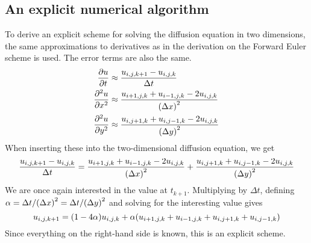 \subsection{An explicit numerical algorithm}
To derive an explicit scheme for solving the diffusion equation in two dimensions, the same approximations to derivatives as in the derivation on the Forward Euler scheme is used. The error terms are also the same.
\begin{alignat*}{2}
    \pdv{u}{t} &\approx \frac{u_{i,j,k+1} - u_{i,j,k}}{\Delta t}\\
    \pdv[2]{u}{x} &\approx \frac{u_{i+1,j,k} + u_{i-1,j,k} - 2u_{i,j,k}}{\qty(\Delta x)^2}\\
    \pdv[2]{u}{y} &\approx \frac{u_{i,j+1,k} + u_{i,j-1,k} - 2u_{i,j,k}}{\qty(\Delta y)^2}
\end{alignat*}
When inserting these into the two-dimensional diffusion equation, we get
\[
    \frac{u_{i,j,k+1} - u_{i,j,k}}{\Delta t} =
    \frac{u_{i+1,j,k} + u_{i-1,j,k} - 2u_{i,j,k}}{\qty(\Delta x)^2} +
    \frac{u_{i,j+1,k} + u_{i,j-1,k} - 2u_{i,j,k}}{\qty(\Delta y)^2}
\]
We are once again interested in the value at \(t_{k+1}\). Multiplying by \(\Delta t\), defining \(\alpha=\Delta t/\qty(\Delta x)^2=\Delta t/\qty(\Delta y)^2\) and solving for the interesting value gives
\[
    u_{i,j,k+1} = \qty(1-4\alpha)u_{i,j,k} + \alpha\qty(u_{i+1,j,k} + u_{i-1,j,k} + u_{i,j+1,k} + u_{i,j-1,k})
\]
Since everything on the right-hand side is known, this is an explicit scheme.
